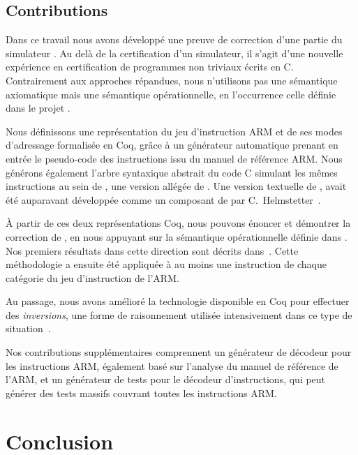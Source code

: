 \subsection*{Contributions}

Dans ce travail nous avons développé une preuve de correction 
d'une partie du simulateur \simsoc.
Au delà de la certification d'un simulateur,
il s'agit d'une nouvelle expérience en certification de programmes
non triviaux écrits en C.
Contrairement aux approches répandues,
nous n'utilisons pas une sémantique axiomatique
mais une sémantique opérationnelle,
en l'occurrence celle définie dans le projet \compcert.

Nous définissons une représentation du jeu d'instruction ARM
et de ses modes d'adressage formalisée en Coq,
grâce à un générateur automatique prenant en entrée
le pseudo-code des instructions issu du manuel de référence ARM.
Nous générons également l'arbre syntaxique abstrait \compcert
du code C simulant les mêmes instructions au sein de \simlight,
une version allégée de \simsoc.
Une version textuelle de \simlight, avait été auparavant développée
comme un composant de \simsoc par C.~Helmstetter~\cite{rapido11}.

À partir de ces deux représentations Coq,
nous pouvons énoncer
et démontrer la correction de \simlight,
en nous appuyant sur la sémantique opérationnelle définie dans \compcert.
Nos premiers résultats dans cette direction sont décrits dans~\cite{2011first}.
Cette méthodologie a ensuite été appliquée à au moins une instruction
de chaque catégorie du jeu d'instruction de l'ARM.

Au passage, nous avons amélioré la technologie
disponible en Coq pour effectuer des \emph{inversions},
une forme de raisonnement utilisée intensivement
dans ce type de situation~\cite{2013itp}.

Nos contributions supplémentaires comprennent un générateur de
décodeur pour les instructions ARM, également basé sur l'analyse du
manuel de référence de l'ARM,
et un générateur de tests pour le décodeur d'instructions,
qui peut générer des tests massifs couvrant toutes les instructions ARM.

\newpage
\section*{Conclusion}


